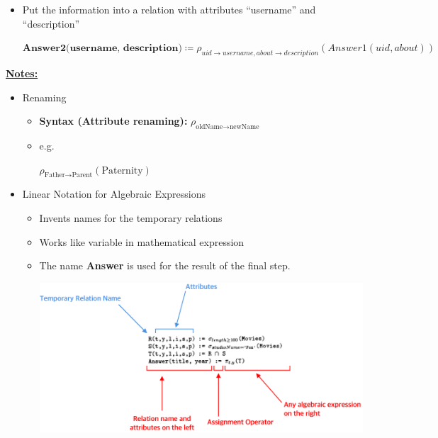 \documentclass[12pt]{article}
\begin{document}
\begin{enumerate}[1.]
\begin{itemize}
        \item Put the information into a relation with attributes ``username'' and
        ``description''

        \begin{mdframed}
        $\textbf{Answer2(username, description)} \coloneqq \rho_{uid \to username, about \to description}(Answer1(uid, about))$
        \end{mdframed}
    \end{itemize}

    \bigskip

    \underline{\textbf{Notes:}}

    \bigskip

    \begin{itemize}
        \item Renaming
        \begin{itemize}
            \item \textbf{Syntax (Attribute renaming):} $\rho_{\text{oldName} \to \text{newName}}$
            \item e.g.

            \bigskip

            $\rho_{\text{Father} \to \text{Parent}}(\text{Paternity})$
        \end{itemize}
        \item Linear Notation for Algebraic Expressions
        \begin{itemize}
            \item Invents names for the temporary relations
            \item Works like variable in mathematical expression
            \item The name \textbf{Answer} is used for the result of the final step.

            \begin{center}
            \includegraphics[width=\linewidth]{../images/assignment_1_solution_1.png}
            \end{center}
        \end{itemize}


\end{itemize}
\end{enumerate}
\end{document}
